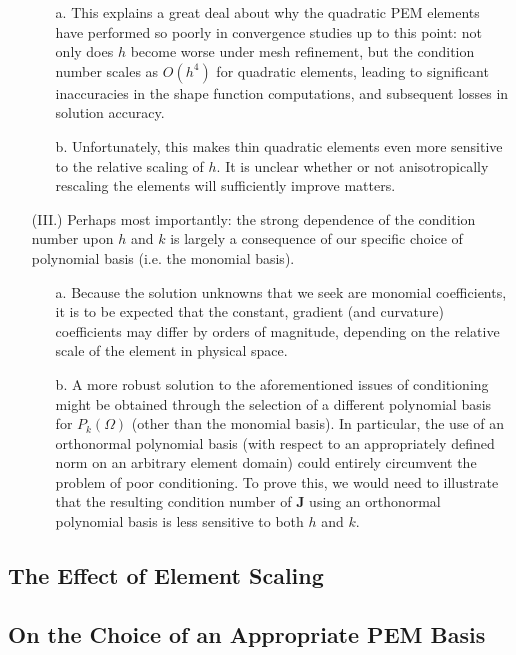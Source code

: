 \begin{itemize}
	\begin{itemize}
		\item[a.] This explains a great deal about why the quadratic PEM elements have performed so poorly in convergence studies up to this point: not only does $h$ become worse under mesh refinement, but the condition number scales as $O(h^4)$ for quadratic elements, leading to significant inaccuracies in the shape function computations, and subsequent losses in solution accuracy.
		\item[b.] Unfortunately, this makes thin quadratic elements even more sensitive to the relative scaling of $h$. It is unclear whether or not anisotropically rescaling the elements will sufficiently improve matters.
	\end{itemize}
	\item[(III.)] Perhaps most importantly: the strong dependence of the condition number upon $h$ and $k$ is largely a consequence of our specific choice of polynomial basis (i.e. the monomial basis).
	\begin{itemize}
		\item[a.] Because the solution unknowns that we seek are monomial coefficients, it is to be expected that the constant, gradient (and curvature) coefficients may differ by orders of magnitude, depending on the relative scale of the element in physical space.
		\item[b.] A more robust solution to the aforementioned issues of conditioning might be obtained through the selection of a different polynomial basis for $P_k (\Omega)$ (other than the monomial basis). In particular, the use of an orthonormal polynomial basis (with respect to an appropriately defined norm on an arbitrary element domain) could entirely circumvent the problem of poor conditioning. To prove this, we would need to illustrate that the resulting condition number of $\mathbf{J}$ using an orthonormal polynomial basis is less sensitive to both $h$ and $k$.
	\end{itemize}
\end{itemize}

\subsection{The Effect of Element Scaling}
\subsection{On the Choice of an Appropriate PEM Basis}
